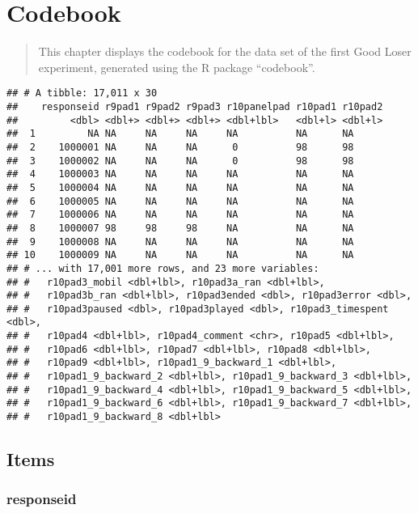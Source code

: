 \documentclass[]{book}
\begin{document}
\chapter{Codebook}\label{codebook-1}

\begin{quote}
This chapter displays the codebook for the data set of the first Good
Loser experiment, generated using the R package ``codebook''.
\end{quote}

\begin{verbatim}
## # A tibble: 17,011 x 30
##    responseid r9pad1 r9pad2 r9pad3 r10panelpad r10pad1 r10pad2
##         <dbl> <dbl+> <dbl+> <dbl+> <dbl+lbl>   <dbl+l> <dbl+l>
##  1         NA NA     NA     NA     NA          NA      NA     
##  2    1000001 NA     NA     NA      0          98      98     
##  3    1000002 NA     NA     NA      0          98      98     
##  4    1000003 NA     NA     NA     NA          NA      NA     
##  5    1000004 NA     NA     NA     NA          NA      NA     
##  6    1000005 NA     NA     NA     NA          NA      NA     
##  7    1000006 NA     NA     NA     NA          NA      NA     
##  8    1000007 98     98     98     NA          NA      NA     
##  9    1000008 NA     NA     NA     NA          NA      NA     
## 10    1000009 NA     NA     NA     NA          NA      NA     
## # ... with 17,001 more rows, and 23 more variables:
## #   r10pad3_mobil <dbl+lbl>, r10pad3a_ran <dbl+lbl>,
## #   r10pad3b_ran <dbl+lbl>, r10pad3ended <dbl>, r10pad3error <dbl>,
## #   r10pad3paused <dbl>, r10pad3played <dbl>, r10pad3_timespent <dbl>,
## #   r10pad4 <dbl+lbl>, r10pad4_comment <chr>, r10pad5 <dbl+lbl>,
## #   r10pad6 <dbl+lbl>, r10pad7 <dbl+lbl>, r10pad8 <dbl+lbl>,
## #   r10pad9 <dbl+lbl>, r10pad1_9_backward_1 <dbl+lbl>,
## #   r10pad1_9_backward_2 <dbl+lbl>, r10pad1_9_backward_3 <dbl+lbl>,
## #   r10pad1_9_backward_4 <dbl+lbl>, r10pad1_9_backward_5 <dbl+lbl>,
## #   r10pad1_9_backward_6 <dbl+lbl>, r10pad1_9_backward_7 <dbl+lbl>,
## #   r10pad1_9_backward_8 <dbl+lbl>
\end{verbatim}

\section{Items}\label{items-1}

\subsection{responseid}\label{responseid}
\end{document}
